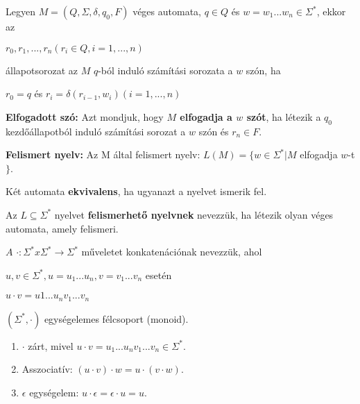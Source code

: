 \documentclass[10pt]{article}
\renewcommand{\\}{\par\noindent}
\begin{document}
\begin{frame}
\begin{tcolorbox}[squeezed title={Def.: Számítási sorozat, elfogadott szó, felismert nyelv}]
Legyen $M = (Q, {\Sigma}, {\delta}, q_0, F)$ véges automata, $q \in Q$ és $w = w_1...w_n \in {\Sigma}^*$, ekkor az\\
\medskip
$r_0, r_1, ..., r_n (r_i \in Q, i = 1, ..., n)$\\
\medskip
állapotsorozat az $M$ $q$-ból induló számítási sorozata a $w$ szón, ha\\
\medskip
$r_0 = q$ és $r_i = {\delta}(r_{i - 1}, w_i)(i = 1, ..., n)$\\
\bigskip
\textbf{Elfogadott szó:} Azt mondjuk, hogy \textbf{$M$ elfogadja a $w$ szót}, ha létezik a $q_0$ kezdőállapotból induló számítási sorozat a $w$ szón és $r_n \in F$.\\
\bigskip
\textbf{Felismert nyelv:} Az M által felismert nyelv: $L(M) = \{w \in {\Sigma}^* | M$ elfogadja $w$-t$\}$.\\
\bigskip
Két automata \textbf{ekvivalens}, ha ugyanazt a nyelvet ismerik fel.
\end{tcolorbox}

\begin{tcolorbox}[title={Def.: Felismerhető nyelv}]
Az $L \subseteq {\Sigma}^*$ nyelvet \textbf{felismerhető nyelvnek} nevezzük, ha létezik olyan véges automata, amely felismeri.
\end{tcolorbox}

\begin{tcolorbox}[title={Def.: Konkatenáció}]
$A$ $\cdot : {\Sigma}^* x {\Sigma}^* \rightarrow {\Sigma}^*$ műveletet konkatenációnak nevezzük, ahol\\
\medskip
$u, v \in {\Sigma}^*, u = u_1...u_n, v = v_1...v_n$ esetén\\
$u \cdot v = u1...u_nv_1...v_n$
\end{tcolorbox}

\begin{tcolorbox}[title={Ész}]
$({\Sigma}^*, {\cdot})$ egységelemes félcsoport (monoid).\\
\begin{enumerate}
\item $\cdot$ zárt, mivel $u \cdot v = u_1...u_nv_1...v_n \in {\Sigma}^*$.
\item Asszociatív: $(u \cdot v) \cdot w = u \cdot (v \cdot w)$.
\item $\epsilon$ egységelem: $u \cdot \epsilon = \epsilon \cdot u = u$.
\end{enumerate}
\end{tcolorbox}

\end{frame}
\end{document}
